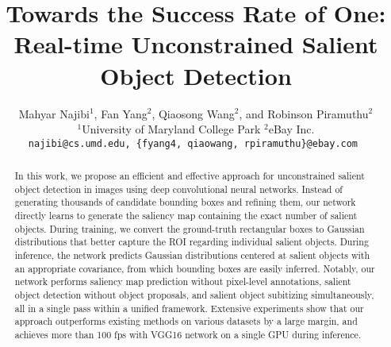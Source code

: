 \documentclass[10pt,twocolumn,letterpaper]{article}
\begin{document}
\title{Towards the Success Rate of One:\\ Real-time Unconstrained Salient Object Detection}
\author{
Mahyar Najibi$^1$, Fan Yang$^2$, Qiaosong Wang$^2$, and Robinson Piramuthu$^2$ \\
$^1$University of Maryland College Park \hspace{8mm} $^2$eBay Inc. \\
\tt\small najibi@cs.umd.edu, \{fyang4, qiaowang, rpiramuthu\}@ebay.com
}


\maketitle

\thispagestyle{empty}
\begin{abstract}
In this work, we propose an efficient and effective approach for unconstrained salient object detection in images using deep convolutional neural networks. Instead of generating thousands of candidate bounding boxes and refining them, our network directly learns to generate the saliency map containing the exact number of salient objects. During training, we convert the ground-truth rectangular boxes to Gaussian distributions that better capture the ROI regarding individual salient objects. During inference, the network predicts Gaussian distributions centered at salient objects with an appropriate covariance, from which bounding boxes are easily inferred. Notably, our network performs saliency map prediction without pixel-level annotations, salient object detection without object proposals, and salient object subitizing simultaneously, all in a single pass within a unified framework. Extensive experiments show that our approach outperforms existing methods on various datasets by a large margin, and achieves more than 100 fps with VGG16 network on a single GPU during inference.
\end{abstract}
\end{document}
